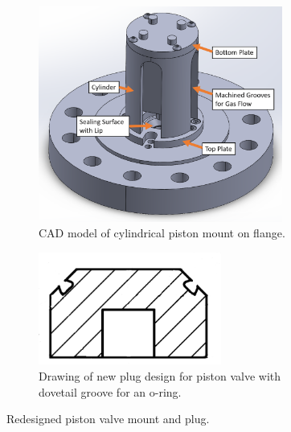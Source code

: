 \begin{figure}[tb]
    \vspace{16pt}
    \centering
    \begin{subfigure}[t]{0.45\textwidth}
        \centering
        \includegraphics[width=0.88\textwidth]{design/photos/piston_mount_gen2_cad_labels.png}
        \caption{CAD model of cylindrical piston mount on flange.}
        \label{fig:cad mount 2}
    \end{subfigure}
    \hfill
    \begin{subfigure}[t]{0.45\textwidth}
        \centering
        \includegraphics[width=0.66\textwidth]{design/photos/new_plug_draw_crop_paint.png}
        \caption{Drawing of new plug design for piston valve with dovetail groove for an o-ring.}
        \label{fig:plug v2 draw}
    \end{subfigure}
    
    \caption{Redesigned piston valve mount and plug.}
    \label{fig:redesign}
    \vspace{16pt}
\end{figure}


